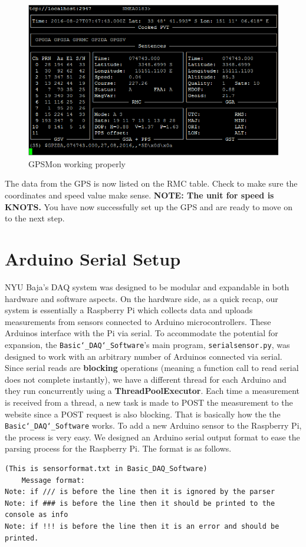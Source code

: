 \documentclass[12pt, letterpaper]{article}
\begin{document}
{{\begin{figure}[h!]
	\centering
	\includegraphics[width=1\columnwidth]{assets/gpsmon.png}
	\caption{GPSMon working properly}
	\end{figure}	

\par The data from the GPS is now listed on the RMC table. Check to make sure the coordinates and speed value make sense. \textbf{NOTE: The unit for speed is KNOTS.} You have now successfully set up the GPS and are ready to move on to the next step. 

\section {Arduino Serial Setup}

\par NYU Baja's DAQ system was designed to be modular and expandable in both hardware and software aspects. On the hardware side, as a quick recap, our system is essentially a Raspberry Pi which collects data and uploads measurements from sensors connected to Arduino microcontrollers. These Arduinos interface with the Pi via serial. To accommodate the potential for expansion, the \texttt{Basic\char`_DAQ\char`_Software}'s main program, \texttt{serialsensor.py}, was designed to work with an arbitrary number of Arduinos connected via serial. Since serial reads are \textbf{blocking} operations (meaning a function call to read serial does not complete instantly), we have a different thread for each Arduino and they run concurrently using a \textbf{ThreadPoolExecutor}. Each time a measurement is received from a thread, a new task is made to POST the measurement to the website since a POST request is also blocking. That is basically how the the \texttt{Basic\char`_DAQ\char`_Software} works. To add a new Arduino sensor to the Raspberry Pi, the process is very easy. We designed an Arduino serial output format to ease the parsing process for the Raspberry Pi. The format is as follows.
\begin{verbatim}
(This is sensorformat.txt in Basic_DAQ_Software)
	Message format:
Note: if /// is before the line then it is ignored by the parser
Note: if ### is before the line then it should be printed to the console as info
Note: if !!! is before the line then it is an error and should be printed.


\end{verbatim}}}
\end{document}
